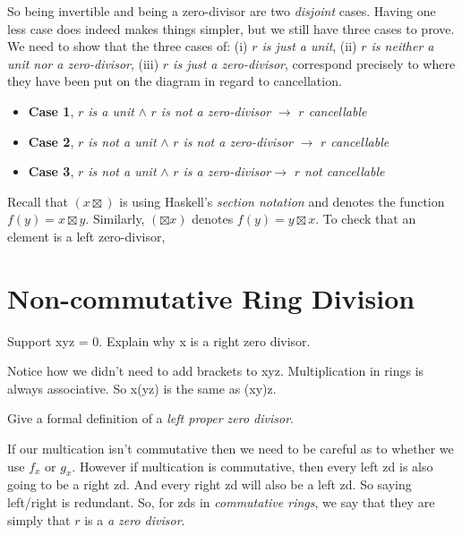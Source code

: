 \frmrule

So being invertible and being a zero-divisor are two \textit{disjoint} cases.
Having one less case does indeed makes things simpler, but we still have three cases 
to prove. We need to show that the three cases of: (i) \textit{$r$ is just a unit}, 
(ii) \textit{$r$ is neither a unit nor a zero-divisor}, (iii) \textit{$r$ is just a zero-divisor}, 
correspond precisely to where they have been put on the diagram in regard to cancellation.  

\begin{itemize}
\renewcommand{\labelitemi}{$\Box$}
\item \textbf{Case 1}, \textit{$r$ is a unit} $\wedge$ \textit{$r$ is not a zero-divisor} $\rightarrow$ \textit{$r$ cancellable}  
\item \textbf{Case 2}, \textit{$r$ is not a unit} $\wedge$ \textit{$r$ is not a zero-divisor} $\rightarrow$ \textit{$r$ cancellable}   
\item \textbf{Case 3}, \textit{$r$ is not a unit} $\wedge$ \textit{$r$ is a zero-divisor}$\rightarrow$ \textit{$r$ not cancellable}   
\end{itemize}

\frmrule


Recall that $(x \boxtimes)$ is using Haskell's \textit{section notation} and denotes 
the function $f(y) = x \boxtimes y$. Similarly, $(\boxtimes x)$ denotes $f(y) = y \boxtimes x$. To check 
that an element is a left zero-divisor, 


\frmrule


\section{Non-commutative Ring Division}

\begin{example}
Support xyz = 0. Explain why x is a right zero divisor.
\end{example}

Notice how we didn't need to add brackets to xyz. Multiplication in rings is always associative.
So x(yz) is the same as (xy)z. 

\frmrule

\begin{example}
Give a formal definition of a \textit{left proper zero divisor}. 
\end{example}

\frmrule

If our multication isn't commutative then we need to be careful as to whether we use $f_x$ or $g_x$. 
However if multication is commutative, then every left zd is also going to be a right zd.
And every right zd will also be a left zd. So saying left/right is redundant.
So, for zds in \textit{commutative rings}, we say that 
they are simply that $r$ is a \textit{a zero divisor}.  


